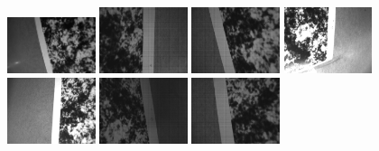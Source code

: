 \documentclass{report}
\begin{document}
\begin{figure}
\centering
\includegraphics[width=0.23\textwidth]{images/cam4rig/1} \includegraphics[width=0.23\textwidth]{images/cam4rig/2} \hspace{2pt}
\includegraphics[width=0.23\textwidth]{images/cam4rig/3}
\includegraphics[width=0.23\textwidth]{images/cam4rig/4} \\
\vspace{8pt}
\includegraphics[width=0.23\textwidth]{images/cam4rig/5} \includegraphics[width=0.23\textwidth]{images/cam4rig/6} \hspace{2pt}
\includegraphics[width=0.23\textwidth]{images/cam4rig/7}

\end{figure}
\end{document}
